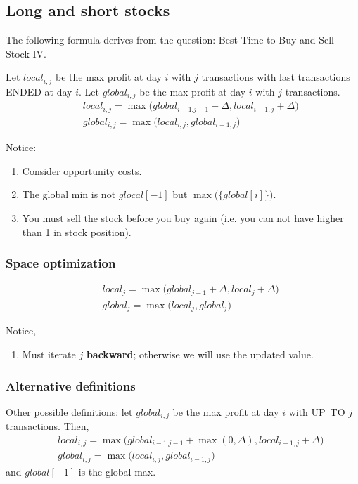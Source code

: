 {\subsection{Long and short stocks}
The following formula derives from the question: Best Time to Buy and Sell Stock IV. 

Let $local_{i, j}$ be the max profit at day $i$ with $j$ transactions with last transactions ENDED at day $i$. Let $global_{i, j}$ be the max profit at day $i$ with $j$ transactions.  
\begin{eqnarray}
&& local_{i,j} = \max\Big(global_{i-1.j-1}+\Delta, local_{i-1,j}+\Delta\Big) \nonumber \\
&& global_{i,j} = \max\Big(local_{i, j}, global_{i-1,j}\Big)
\end{eqnarray}

Notice:
\begin{enumerate}
\item Consider opportunity costs.
\item The global min is not $glocal[-1]$ but $\max\big(\{global[i]\}\big)$.
\item You must sell the stock before you buy again (i.e. you can not have higher than 1 in stock position). 
\end{enumerate}

\subsubsection{Space optimization}
\begin{eqnarray}
&& local_{j} = \max\Big(global_{j-1} + \Delta, local_{j}+\Delta\Big)
\nonumber \\
&& global_{j} = \max\Big(local_{j}, global_{j}\Big)
\end{eqnarray}

Notice,
\begin{enumerate}
\item Must iterate $j$ \textbf{backward}; otherwise we will use the updated value. 
\end{enumerate}

\subsubsection{Alternative definitions}
Other possible definitions: let $global_{i, j}$ be the max profit
at day $i$ with UP\ TO $j$ transactions. Then, 
\begin{eqnarray}
&& local_{i,j} = \max\Big(global_{i-1.j-1} + \max(0, \Delta), local_{i-1,j}+\Delta\Big)
\nonumber \\
&& global_{i,j} = \max\Big(local_{i, j}, global_{i-1,j}\Big)
\end{eqnarray}
and $global[-1]$ is the global max. 

}
